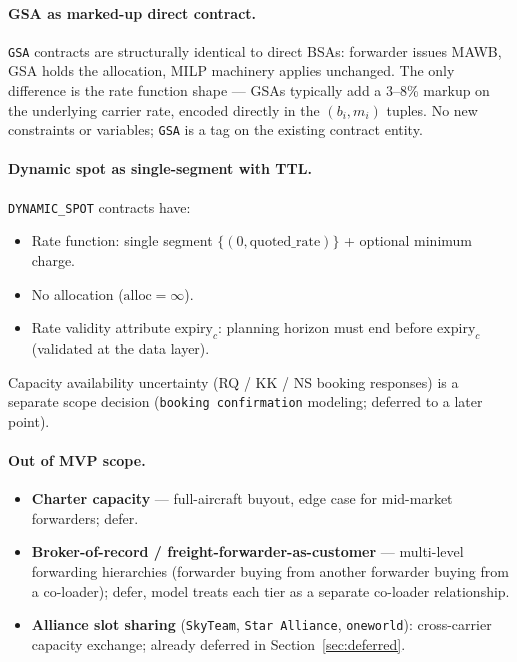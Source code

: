 \documentclass[11pt,a4paper]{article}
\theoremstyle{definition}
\begin{document}
\paragraph{GSA as marked-up direct contract.}
\texttt{GSA} contracts are structurally identical to direct BSAs: forwarder issues
MAWB, GSA holds the allocation, MILP machinery applies unchanged. The only
difference is the rate function shape — GSAs typically add a 3--8\% markup on the
underlying carrier rate, encoded directly in the \((b_i, m_i)\) tuples. No new
constraints or variables; \texttt{GSA} is a tag on the existing contract entity.

\paragraph{Dynamic spot as single-segment with TTL.}
\texttt{DYNAMIC\_SPOT} contracts have:
\begin{itemize}[noitemsep]
  \item Rate function: single segment \(\{(0, \text{quoted\_rate})\}\) + optional
        minimum charge.
  \item No allocation (\(\text{alloc} = \infty\)).
  \item Rate validity attribute \(\text{expiry}_c\): planning horizon must end
        before \(\text{expiry}_c\) (validated at the data layer).
\end{itemize}
Capacity availability uncertainty (RQ / KK / NS booking responses) is a separate
scope decision (\texttt{booking confirmation} modeling; deferred to a later point).

\paragraph{Out of MVP scope.}
\begin{itemize}[noitemsep]
  \item \textbf{Charter capacity} — full-aircraft buyout, edge case for mid-market
        forwarders; defer.
  \item \textbf{Broker-of-record / freight-forwarder-as-customer} — multi-level
        forwarding hierarchies (forwarder buying from another forwarder buying from
        a co-loader); defer, model treats each tier as a separate co-loader
        relationship.
  \item \textbf{Alliance slot sharing} (\texttt{SkyTeam}, \texttt{Star Alliance},
        \texttt{oneworld}): cross-carrier capacity exchange; already deferred in
        Section~\ref{sec:deferred}.
\end{itemize}
\end{document}
